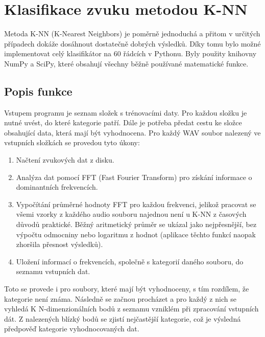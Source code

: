 \documentclass[a4paper,11pt]{article}
\begin{document}
		\section{Klasifikace zvuku metodou K-NN}
			Metoda K-NN (K-Nearest Neighbors) je poměrně jednoduchá a přitom v určitých případech dokáže dosáhnout dostatečně dobrých výsledků. Díky tomu bylo možné implementovat celý klasifikátor na 60 řádcích v Pythonu. Byly použity knihovny NumPy a SciPy, které obsahují všechny běžně používané matematické funkce.
			
			\subsection{Popis funkce}
				Vstupem programu je seznam složek s trénovacími daty. Pro každou složku je nutné uvést, do které kategorie patří. Dále je potřeba předat cestu ke složce obsahující data, která mají být vyhodnocena.
				Pro každý WAV soubor nalezený ve vstupních složkách se provedou tyto úkony:
				
				\begin{enumerate}
					\item Načtení zvukových dat z disku.
					\item Analýza dat pomocí FFT (Fast Fourier Transform) pro získání informace o dominantních frekvencích.
					\item Vypočítání průměrné hodnoty FFT pro každou frekvenci, jelikož pracovat se všemi vzorky z každého audio souboru najednou není u K-NN z časových důvodů praktické. Běžný aritmetický průměr se ukázal jako nejpřesnější, bez výpočtu odmocniny nebo logaritmu z hodnot (aplikace těchto funkcí naopak zhoršila přesnost výsledků).
					\item Uložení informací o frekvencích, společně s kategorií daného souboru, do seznamu vstupních dat.
				\end{enumerate}
			
				Toto se provede i pro soubory, které mají být vyhodnoceny, s tím rozdílem, že kategorie není známa. Následně se začnou procházet a pro každý z nich se vyhledá K N-dimenzionálních bodů z seznamu vzniklém při zpracování vstupních dát. Z nalezených blízký bodů se zjistí nejčastější kategorie, což je výsledná předpověď kategorie vyhodnocovaných dat.
				
\end{document}
